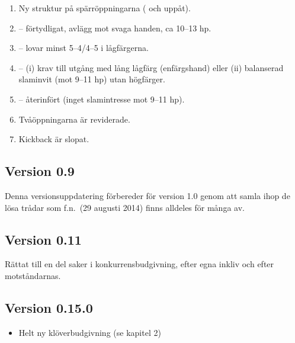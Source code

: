 \begin{enumerate}

\item Ny struktur på spärröppningarna ( och uppåt).

\item {}-- förtydligat, avlägg mot svaga handen, ca 10--13 hp.

\item {}-- lovar minst 5--4/4--5 i lågfärgerna.

\item {}-- (i) krav till utgång med lång lågfärg (enfärgshand)
  eller (ii) balanserad slaminvit (mot 9--11 hp) utan högfärger.

\item {}-- återinfört (inget slamintresse mot 9--11 hp).

\item Tvåöppningarna är reviderade.

\item Kickback är slopat.
\end{enumerate}

\subsection*{Version 0.9}

Denna versionsuppdatering förbereder för version 1.0 genom att samla ihop
de lösa trådar som f.n.\ (29 augusti 2014) finns alldeles för många av.

\subsection*{Version 0.11}

Rättat till en del saker i konkurrensbudgivning, efter egna inkliv och
efter motståndarnas. 

\subsection*{Version 0.15.0}

\begin{itemize}
\item Helt ny klöverbudgivning (se kapitel 2)
\end{itemize}
